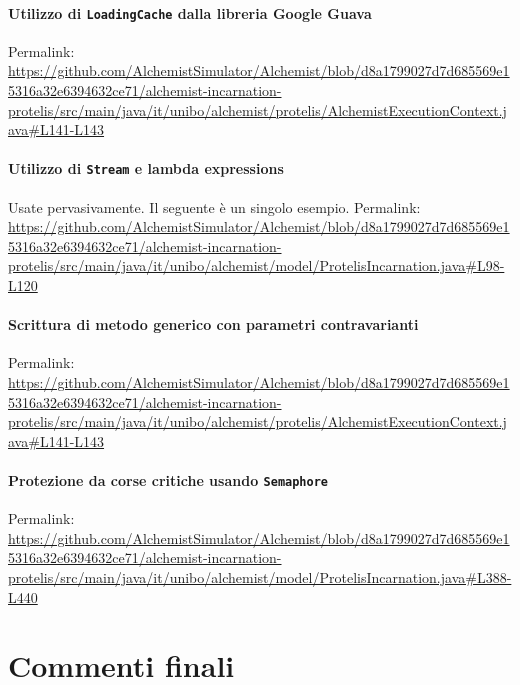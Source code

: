 \documentclass[a4paper,12pt]{report}
\begin{document}
\subsubsection{Utilizzo di \texttt{LoadingCache} dalla libreria Google Guava}

Permalink: \url{https://github.com/AlchemistSimulator/Alchemist/blob/d8a1799027d7d685569e15316a32e6394632ce71/alchemist-incarnation-protelis/src/main/java/it/unibo/alchemist/protelis/AlchemistExecutionContext.java#L141-L143}

\subsubsection{Utilizzo di \texttt{Stream} e lambda expressions}

Usate pervasivamente. Il seguente è un singolo esempio.
Permalink: \url{https://github.com/AlchemistSimulator/Alchemist/blob/d8a1799027d7d685569e15316a32e6394632ce71/alchemist-incarnation-protelis/src/main/java/it/unibo/alchemist/model/ProtelisIncarnation.java#L98-L120}

\subsubsection{Scrittura di metodo generico con parametri contravarianti}

Permalink: \url{https://github.com/AlchemistSimulator/Alchemist/blob/d8a1799027d7d685569e15316a32e6394632ce71/alchemist-incarnation-protelis/src/main/java/it/unibo/alchemist/protelis/AlchemistExecutionContext.java#L141-L143}

\subsubsection{Protezione da corse critiche usando \texttt{Semaphore}}

Permalink: \url{https://github.com/AlchemistSimulator/Alchemist/blob/d8a1799027d7d685569e15316a32e6394632ce71/alchemist-incarnation-protelis/src/main/java/it/unibo/alchemist/model/ProtelisIncarnation.java#L388-L440}


\chapter{Commenti finali}
\end{document}
